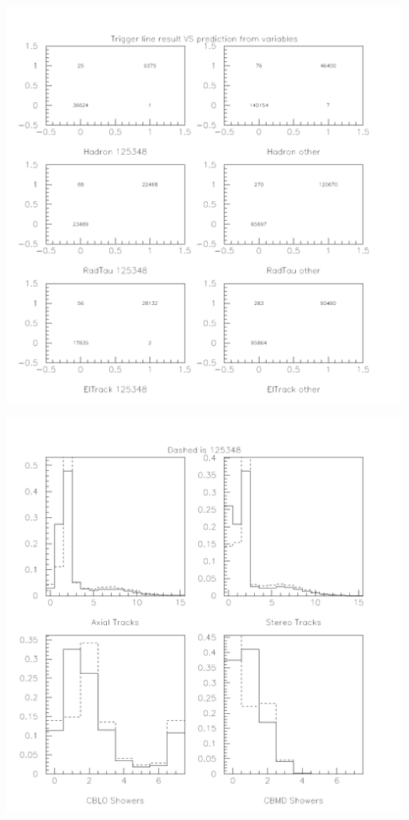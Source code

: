 \documentclass[landscape]{article}
\begin{document}
\begin{center}
  \includegraphics[height=\textheight]{tr2_triggerlines_ok.pdf}
\end{center}

\begin{center}
  \includegraphics[height=\textheight]{tr2_triggervars.pdf}
\end{center}
\end{document}
